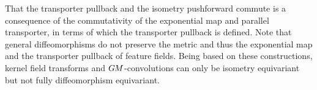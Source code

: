 That the transporter pullback and the isometry pushforward commute is a consequence of the commutativity of the exponential map and parallel transporter, in terms of which the transporter pullback is defined.
Note that general diffeomorphisms do not preserve the metric and thus the exponential map and the transporter pullback of feature fields.
Being based on these constructions, kernel field transforms and $G\mkern-1.4muM$-convolutions can only be isometry equivariant but not fully diffeomorphism equivariant.
